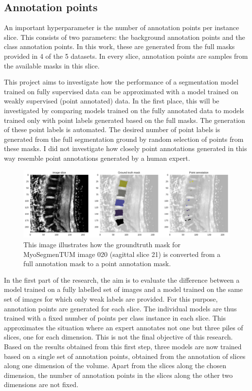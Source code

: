 \subsection{Annotation points\label{sec:annotationPoints}}
\par{
    An important hyperparameter is the number of annotation points per instance slice.
    This consists of two parameters: the background annotation points and the class annotation points.
    In this work, these are generated from the full masks provided in 4 of the 5 datasets.
    In every slice, annotation points are samples from the available masks in this slice.
}
\par{
    This project aims to investigate how the performance of a segmentation model trained on fully supervised data can be approximated with a model trained on weakly supervised (point annotated) data.
    In the first place, this will be investigated by comparing models trained on the fully annotated data to models trained only with point labels generated based on the full masks.
    The generation of these point labels is automated. 
    The desired number of point labels is generated from the full segmentation ground by random selection of points from these masks.
    I did not investigate how closely point annotations generated in this way resemble point annotations generated by a human expert.
}
\begin{figure}
    \includegraphics[width=.99\textwidth]{images/MyoSegmenTUM020_s21_points.pdf}
    \caption{This image illustrates how the \Gls{groundtruth} mask for MyoSegmenTUM image 020 (sagittal slice 21) is converted from a full annotation mask to a point annotation mask.
    \protect
    }
\end{figure}
\par{
    In the first part of the research, the aim is to evaluate the difference between a model trained on a fully labelled set of images and a model trained on the same set of images for which only weak labels are provided.
    For this purpose, annotation points are generated for each slice.
    The individual models are thus trained with a fixed number of points per class instance in each slice. 
    This approximates the situation where an expert annotates not one but three piles of slices, one for each dimension. This is not the final objective of this research.
    Based on the results obtained from this first step, three models are now trained based on a single set of annotation points, obtained from the annotation of slices along one dimension of the volume.
    Apart from the slices along the chosen dimension, the number of annotation points in the slices along the other two dimensions are not fixed.
}
\FloatBarrier
\newpage
